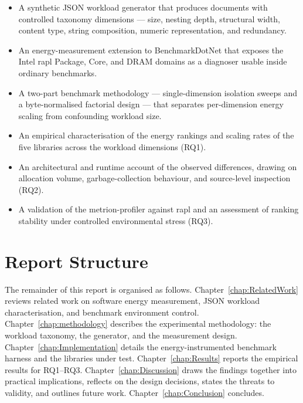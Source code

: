 \begin{itemize}
  \item A synthetic JSON workload generator that produces documents with
    controlled taxonomy dimensions --- size, nesting depth, structural width,
    content type, string composition, numeric representation, and redundancy.
  \item An energy-measurement extension to BenchmarkDotNet that exposes the
    Intel \gls{rapl} Package, Core, and DRAM domains as a diagnoser usable
    inside ordinary benchmarks.
  \item A two-part benchmark methodology --- single-dimension isolation
    sweeps and a byte-normalised factorial design --- that separates
    per-dimension energy scaling from confounding workload size.
  \item An empirical characterisation of the energy rankings and scaling
    rates of the five libraries across the workload dimensions (RQ1).
  \item An architectural and runtime account of the observed differences,
    drawing on allocation volume, garbage-collection behaviour, and
    source-level inspection (RQ2).
  \item A validation of the \gls{metrion-profiler} against \gls{rapl} and an
    assessment of ranking stability under controlled environmental stress
    (RQ3).
\end{itemize}

\section{Report Structure}
\label{sec:intro-structure}

The remainder of this report is organised as follows.
Chapter~\ref{chap:RelatedWork} reviews related work on software energy
measurement, JSON workload characterisation, and benchmark environment
control.
Chapter~\ref{chap:methodology} describes the experimental methodology: the
workload taxonomy, the generator, and the measurement design.
Chapter~\ref{chap:Implementation} details the energy-instrumented benchmark
harness and the libraries under test.
Chapter~\ref{chap:Results} reports the empirical results for RQ1--RQ3.
Chapter~\ref{chap:Discussion} draws the findings together into practical
implications, reflects on the design decisions, states the threats to
validity, and outlines future work.
Chapter~\ref{chap:Conclusion} concludes.


%

